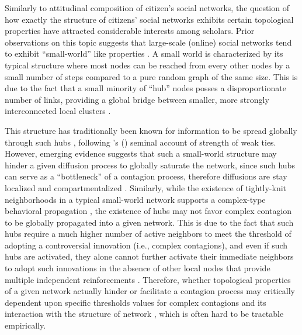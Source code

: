 \documentclass[man, 12pt, a4paper, noextraspace]{apa6}
\begin{document}
    Similarly to attitudinal composition of citizen's social networks, the question of how exactly the structure of citizens' social networks exhibits certain topological properties have attracted considerable interests among scholars. Prior observations on this topic suggests that large-scale (online) social networks tend to exhibit \enquote{small-world} like properties \parencite{kumar2010structure, ugander2011anatomy}. A small world is characterized by its typical structure where most nodes can be reached from every other nodes by a small number of steps compared to a pure random graph of the same size. This is due to the fact that a small minority of \enquote{hub} nodes posses a disproportionate number of links, providing a global bridge between smaller, more strongly interconnected local clusters \parencite{barabasi2004linked}. 
    
    This structure has traditionally been known for information to be spread globally through such hubs \parencite[e.g.,][]{Bakshy_2012}, following \citeauthor{granovetter1977strength}'s (\citeyear{granovetter1977strength}) seminal account of strength of weak ties. However, emerging evidence suggests that such a small-world structure may hinder a given diffusion process to globally saturate the network, since such hubs can serve as a \enquote{bottleneck} of a contagion process, therefore diffusions are stay localized and compartmentalized \parencite[e.g.,][]{banos2013diffusion, centola2007complex, zhao2010weak}. Similarly, while the existence of tightly-knit neighborhoods in a typical small-world network supports a complex-type behavioral propagation \parencite[i.e., an innovation that runs counter to prevalent norms and values:][]{Centola2010Sience}, the existence of hubs may not favor complex contagion to be globally propagated into a given network. This is due to the fact that such hubs require a much higher number of active neighbors to meet the threshold of adopting a controversial innovation (i.e., complex contagions), and even if such hubs are activated, they alone cannot further activate their immediate neighbors to adopt such  innovations in the absence of other local nodes that provide multiple independent reinforcements \parencite{Centola2007449, zhao2010weak, gonzalez2017decoding}. Therefore, whether topological properties of a given network actually hinder or facilitate a contagion process may critically dependent upon specific thresholds values for complex contagions and its interaction with the structure of network \parencite[e.g.,][]{Centola2007449}, which is often hard to be tractable empirically.   
    
\end{document}
